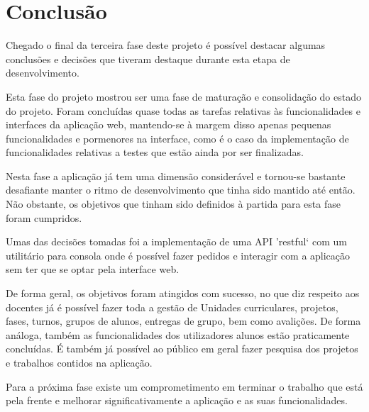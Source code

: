 \section{Conclusão}
Chegado o final da terceira fase deste projeto é possível destacar algumas conclusões e decisões que tiveram destaque durante esta etapa de desenvolvimento.

Esta fase do projeto mostrou ser uma fase de maturação e consolidação do estado do projeto. Foram concluídas quase todas as tarefas relativas às funcionalidades e interfaces da aplicação web, mantendo-se à margem disso apenas pequenas funcionalidades e pormenores na interface, como é o caso da implementação de funcionalidades relativas a testes que estão ainda por ser finalizadas.

Nesta fase a aplicação já tem uma dimensão considerável e tornou-se bastante desafiante manter o ritmo de desenvolvimento que tinha sido mantido até então. Não obstante, os objetivos que tinham sido definidos à partida para esta fase foram cumpridos.

Umas das decisões tomadas foi a implementação de uma API 'restful` com um utilitário para consola onde é possível fazer pedidos e interagir com a aplicação sem ter que se optar pela interface web. 

De forma geral, os objetivos foram atingidos com sucesso, no que diz respeito aos docentes já é possível fazer toda a gestão de Unidades curriculares, projetos, fases, turnos, grupos de alunos, entregas de grupo, bem como avalições. De forma análoga, também as funcionalidades dos utilizadores alunos estão praticamente concluídas. É também já possível ao público em geral fazer pesquisa dos projetos e trabalhos contidos na aplicação.

Para a próxima fase existe um comprometimento em terminar o trabalho que está pela frente e melhorar significativamente a aplicação e as suas funcionalidades.

\newpage
